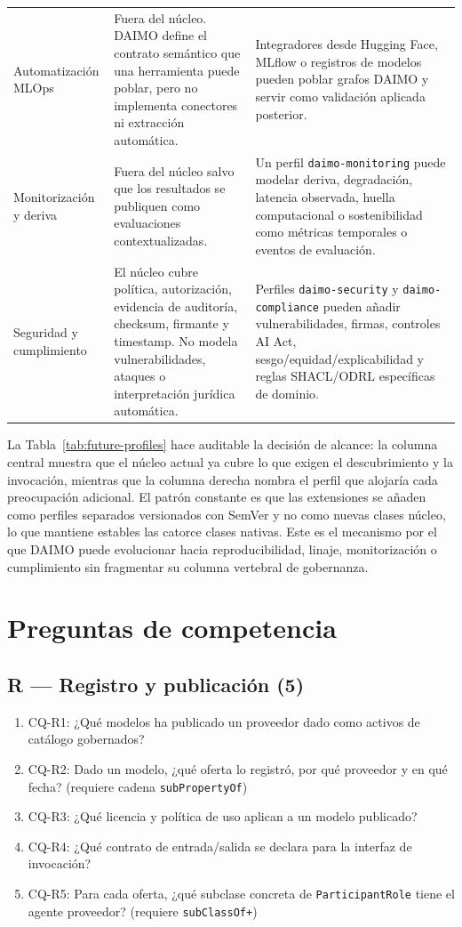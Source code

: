 \documentclass[Afour,sagev,times]{sagej}
\newcommand{\code}[1]{\texttt{#1}}
\newcommand{\cq}[1]{\textsf{#1}}
\begin{document}
\begin{table}[tb]
\begin{tabular}{@{}p{3.2cm}p{5.9cm}p{6.0cm}@{}}
Automatización MLOps & Fuera del núcleo. DAIMO define el contrato semántico que una herramienta puede poblar, pero no implementa conectores ni extracción automática. & Integradores desde Hugging Face, MLflow o registros de modelos pueden poblar grafos DAIMO y servir como validación aplicada posterior. \\
Monitorización y deriva & Fuera del núcleo salvo que los resultados se publiquen como evaluaciones contextualizadas. & Un perfil \code{daimo-monitoring} puede modelar deriva, degradación, latencia observada, huella computacional o sostenibilidad como métricas temporales o eventos de evaluación. \\
Seguridad y cumplimiento & El núcleo cubre política, autorización, evidencia de auditoría, checksum, firmante y timestamp. No modela vulnerabilidades, ataques o interpretación jurídica automática. & Perfiles \code{daimo-security} y \code{daimo-compliance} pueden añadir vulnerabilidades, firmas, controles AI Act, sesgo/equidad/explicabilidad y reglas SHACL/ODRL específicas de dominio. \\
\bottomrule
\end{tabular}
\end{table}

La Tabla~\ref{tab:future-profiles} hace auditable la decisión de alcance: la columna central muestra que el núcleo actual ya cubre lo que exigen el descubrimiento y la invocación, mientras que la columna derecha nombra el perfil que alojaría cada preocupación adicional. El patrón constante es que las extensiones se añaden como perfiles separados versionados con SemVer y no como nuevas clases núcleo, lo que mantiene estables las catorce clases nativas. Este es el mecanismo por el que DAIMO puede evolucionar hacia reproducibilidad, linaje, monitorización o cumplimiento sin fragmentar su columna vertebral de gobernanza.

\section{Preguntas de competencia}\label{app:cqs}

\subsection*{R --- Registro y publicación (5)}
\begin{enumerate}[label=\arabic*., leftmargin=*]
\item \cq{CQ-R1}: ¿Qué modelos ha publicado un proveedor dado como activos de catálogo gobernados?
\item \cq{CQ-R2}: Dado un modelo, ¿qué oferta lo registró, por qué proveedor y en qué fecha? (requiere cadena \code{subPropertyOf})
\item \cq{CQ-R3}: ¿Qué licencia y política de uso aplican a un modelo publicado?
\item \cq{CQ-R4}: ¿Qué contrato de entrada/salida se declara para la interfaz de invocación?
\item \cq{CQ-R5}: Para cada oferta, ¿qué subclase concreta de \code{ParticipantRole} tiene el agente proveedor? (requiere \code{subClassOf+})
\end{enumerate}
\end{document}
